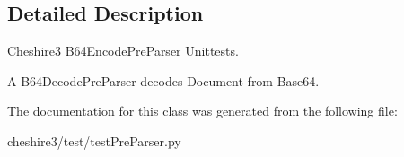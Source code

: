 \subsection{Detailed Description}
\begin{DoxyVerb}Cheshire3 B64EncodePreParser Unittests.

A B64DecodePreParser decodes Document from Base64.\end{DoxyVerb}
 

The documentation for this class was generated from the following file\-:\begin{DoxyCompactItemize}
\item 
cheshire3/test/test\-Pre\-Parser.\-py\end{DoxyCompactItemize}
